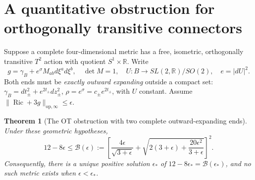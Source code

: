 \documentclass[a4paper,11pt]{article}
\numberwithin{equation}{section}
\newtheorem{theorem}{Theorem}[section]
\theoremstyle{definition}
\newcommand{\Ric}{\operatorname{Ric}}
\newcommand{\op}{\mathrm{op}}
\begin{document}
\section{A quantitative obstruction for orthogonally transitive connectors}
Suppose a complete four-dimensional metric has a free, isometric, orthogonally transitive $T^2$ action with quotient $S^1\times\mathbb R$. Write
\[
 g=\gamma_B+e^\sigma M_{ab}d\xi^ad\xi^b,
 \quad\det M=1,\quad
 U:B\to SL(2,\mathbb R)/SO(2),\quad e=|dU|^2.
\]
Both ends must be \emph{exactly outward expanding} outside a compact set:
$\gamma_B=dt_\pm^2+e^{2t_\pm}dz_\pm^2$,
$\rho=e^\sigma=c_\pm e^{2t_\pm}$, with $U$ constant.
Assume $\|\Ric+3g\|_{\op,\infty}\le\epsilon$.
\begin{theorem}[The OT obstruction with two complete outward-expanding ends]\label{thm:OT}
Under these geometric hypotheses,
\[
 12-8\epsilon\le
 \mathcal B(\epsilon):=
 \left[\frac{4\epsilon}{\sqrt{3+\epsilon}}
 +\sqrt{2(3+\epsilon)+\frac{20\epsilon^2}{3+\epsilon}}\right]^2.
\]
Consequently, there is a unique positive solution $\epsilon_*$ of
$12-8\epsilon_*=\mathcal B(\epsilon_*)$, and no such metric exists when $\epsilon<\epsilon_*$.
\end{theorem}
\end{document}
